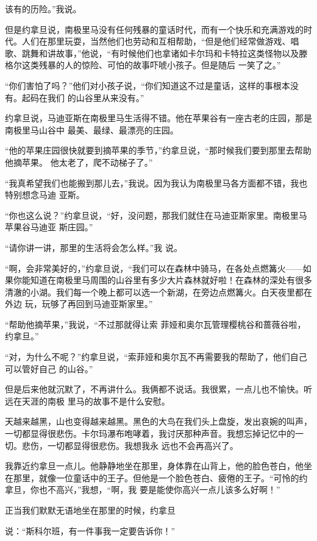 \documentclass{article}
\begin{document}
\newpage
该有的历险。”我说。 

但是约拿旦说，南极里马没有任何残暴的童话时代，而有一个快乐和充满游戏的时代。人们在那里玩耍，当然他们也劳动和互相帮助，“但是他们经常做游戏、唱歌、跳舞和讲故事，”他说，“有时候他们也拿诸如卡尔玛和卡特拉这类怪物以及滕格尔这类残暴的人的惊险、可怕的故事吓唬小孩子。但是随后
一笑了之。” 

“你们害怕了吗？”他们对小孩子说，“你们知道这不过是童话，这样的事根本没有。起码在我们
的山谷里从来没有。” 

约拿旦说，马迪亚斯在南极里马生活得不错。他在苹果谷有一座古老的庄园，那是南极里马山谷中
最美、最绿、最漂亮的庄园。 

“他的苹果庄园很快就要到摘苹果的季节，”约拿旦说，“那时候我们要到那里去帮助他摘苹果。
他太老了，爬不动梯子了。” 

\newpage

“我真希望我们也能搬到那儿去，”我说。因为我认为南极里马各方面都不错，我也特别想念马迪
亚斯。 

“你也这么说？”约拿旦说，“好，没问题，那我们就住在马迪亚斯家里。南极里马苹果谷马迪亚
斯庄园。” 

“请你讲一讲，那里的生活将会怎么样。”我
说。 

“啊，会非常美好的，”约拿旦说，“我们可以在森林中骑马，在各处点燃篝火——如果你能知道在南极里马周围的山谷里有多少大片森林就好啦！在森林的深处有很多清澈的小湖。我们每一个晚上都可以选一个新湖，在旁边点燃篝火。白天夜里都在外边
玩，玩够了再回到马迪亚斯家里。” 

“帮助他摘苹果，”我说，“不过那就得让索
菲娅和奥尔瓦管理樱桃谷和蔷薇谷啦，约拿旦。” 

\newpage

“对，为什么不呢？”约拿旦说，“索菲娅和奥尔瓦不再需要我的帮助了，他们自己可以管好自己
的山谷。” 

但是后来他就沉默了，不再讲什么。我俩都不说话。我很累，一点儿也不愉快。听远在天涯的南极
里马的故事不是什么安慰。 

天越来越黑，山也变得越来越黑。黑色的大鸟在我们头上盘旋，发出哀婉的叫声，一切都显得很悲伤。卡尔玛瀑布咆哮着，我讨厌那种声音。我想忘掉记忆中的一切。悲伤，一切都显得很悲伤。我想我永
远也不会再高兴了。 

我靠近约拿旦一点儿。他静静地坐在那里，身体靠在山背上，他的脸色苍白，他坐在那里，就像一位童话中的王子。但他是一个脸色苍白、疲倦的王子。“可怜的约拿旦，你也不高兴，”我想，“啊，我
要是能使你高兴一点儿该多么好啊！” 

正当我们默默无语地坐在那里的时候，约拿旦
\newpage

说：“斯科尔班，有一件事我一定要告诉你！” 
\end{document}
